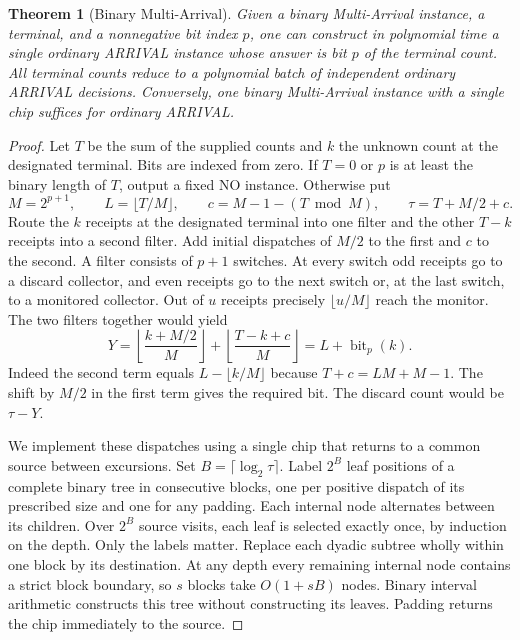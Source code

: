 \documentclass[11pt,oneside,openany,notitlepage]{report}
\newtheorem{theorem}{Theorem}[chapter]
\DeclareMathOperator{\bit}{bit}
\begin{document}
\begin{theorem}[Binary Multi-Arrival]\label{thm:multi}
Given a binary Multi-Arrival instance, a terminal, and a nonnegative bit
index \(p\), one can construct in polynomial time a single ordinary ARRIVAL
instance whose answer is bit \(p\) of the terminal count. All terminal counts
reduce to a polynomial batch of independent ordinary ARRIVAL decisions.
Conversely, one binary Multi-Arrival instance with a single chip suffices
for ordinary ARRIVAL.
\end{theorem}
\begin{proof}
Let \(T\) be the sum of the supplied counts and \(k\) the unknown count at
the designated terminal. Bits are indexed from zero. If \(T=0\) or \(p\)
is at least the binary length of \(T\), output a fixed NO instance. Otherwise
put
\[
 M=2^{p+1},\qquad L=\lfloor T/M\rfloor,\qquad
 c=M-1-(T\bmod M),\qquad \tau=T+M/2+c.
\]
Route the \(k\) receipts at the designated terminal into one filter and
the other \(T-k\) receipts into a second filter. Add initial dispatches
of \(M/2\) to the first and \(c\) to the second. A filter consists of
\(p+1\) switches. At every switch odd receipts go to a discard collector,
and even receipts go to the next switch or, at the last switch, to a
monitored collector. Out of \(u\) receipts precisely \(\lfloor u/M\rfloor\)
reach the monitor. The two filters together would yield
\begin{equation}\label{eq:bit}
 Y=\left\lfloor\frac{k+M/2}{M}\right\rfloor+
   \left\lfloor\frac{T-k+c}{M}\right\rfloor
   = L+\bit_p(k).
\end{equation}
Indeed the second term equals \(L-\lfloor k/M\rfloor\) because
\(T+c=LM+M-1\). The shift by \(M/2\) in the first term gives the required
bit. The discard count would be \(\tau-Y\).

We implement these dispatches using a single chip that returns to a common
source between excursions. Set \(B=\lceil\log_2\tau\rceil\). Label \(2^B\)
leaf positions of a complete binary tree in consecutive blocks, one per
positive dispatch of its prescribed size and one for any padding.
Each internal node alternates between its children. Over \(2^B\) source
visits, each leaf is selected exactly once, by induction on the depth.
Only the labels matter. Replace each dyadic subtree wholly within one
block by its destination. At any depth every remaining internal node
contains a strict block boundary, so \(s\) blocks take \(O(1+sB)\) nodes.
Binary interval arithmetic constructs this tree without constructing its
leaves. Padding returns the chip immediately to the source.


\end{proof}
\end{document}
